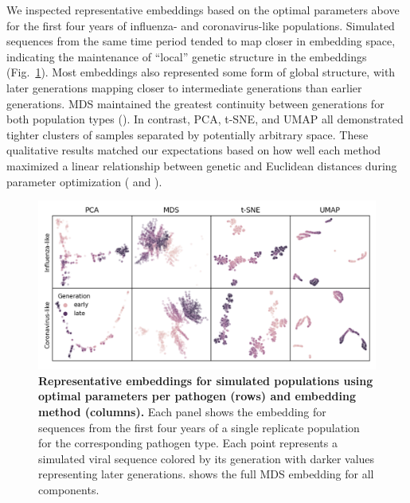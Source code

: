 \documentclass[10pt,letterpaper]{article}
\begin{document}
We inspected representative embeddings based on the optimal parameters above for the first four years of influenza- and coronavirus-like populations.
Simulated sequences from the same time period tended to map closer in embedding space, indicating the maintenance of ``local'' genetic structure in the embeddings (Fig.~\ref{fig:simulated-populations-representative-embeddings}).
Most embeddings also represented some form of global structure, with later generations mapping closer to intermediate generations than earlier generations.
MDS maintained the greatest continuity between generations for both population types ().
In contrast, PCA, t-SNE, and UMAP all demonstrated tighter clusters of samples separated by potentially arbitrary space.
These qualitative results matched our expectations based on how well each method maximized a linear relationship between genetic and Euclidean distances during parameter optimization ( and ).

\begin{figure}[!h]
\includegraphics[width=\columnwidth]{figures/simulated-populations-representative-embeddings.png}
\caption{{\bf Representative embeddings for simulated populations using optimal parameters per pathogen (rows) and embedding method (columns).}
  Each panel shows the embedding for sequences from the first four years of a single replicate population for the corresponding pathogen type.
  Each point represents a simulated viral sequence colored by its generation with darker values representing later generations.
   shows the full MDS embedding for all components.}
\label{fig:simulated-populations-representative-embeddings}
\end{figure}
\end{document}
